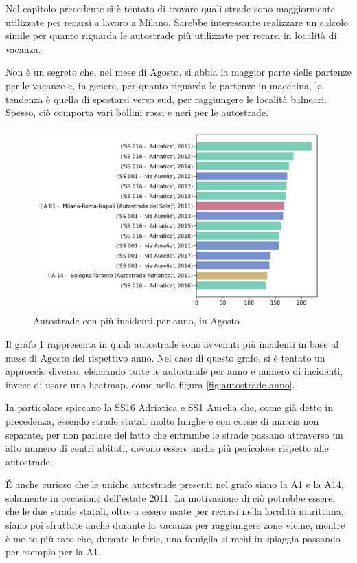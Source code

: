 \documentclass[a4paper]{report}
\begin{document}
Nel capitolo precedente si è tentato di trovare quali strade sono maggiormente 
utilizzate per recarsi a lavoro a Milano. 
Sarebbe interessante realizzare un calcolo simile per quanto riguarda le autostrade 
più utilizzate per recarsi in località di vacanza. 

Non è un segreto che, nel mese di Agosto, si abbia la maggior parte delle 
partenze per le vacanze e, in genere, per quanto riguarda le 
partenze in macchina, la tendenza è quella di spostarsi verso sud, 
per raggiungere le località balneari.
Spesso, ciò comporta vari bollini rossi e neri per le autostrade. 

\begin{figure}
    \includegraphics[width=\linewidth]{../src/incidenti/incidenti_aci/agosto/autostrade_anno_agosto.png}
    \caption{Autostrade con più incidenti per anno, in Agosto}
    \label{fig:autostrade-anno-agosto}
\end{figure}

Il grafo \ref{fig:autostrade-anno-agosto} rappresenta in quali autostrade sono avvenuti 
più incidenti in base al mese di Agosto del rispettivo anno. 
Nel caso di questo grafo, si è tentato un approccio diverso, elencando 
tutte le autostrade per anno e numero di incidenti, invece di usare una 
heatmap, come nella figura \ref{fig:autostrade-anno}.

In particolare spiccano la SS16 Adriatica e SS1 Aurelia che, come già 
detto in precedenza, essendo strade statali molto lunghe e con corsie di marcia 
non separate, per non parlare del fatto che entrambe le strade passano attraverso un 
alto numero di centri abitati, devono essere anche più pericolose rispetto alle 
autostrade.

\'E anche curioso che le uniche autostrade presenti nel grafo siano la A1 e la A14, 
solamente in occasione dell'estate 2011. 
La motivazione di ciò potrebbe essere, che le due strade statali, oltre a essere usate per 
recarsi nella località marittima, siano poi sfruttate anche durante la vacanza per 
raggiungere zone vicine, mentre è molto più raro che, durante le ferie, una famiglia 
si rechi in spiaggia passando per esempio per la A1.
\end{document}
